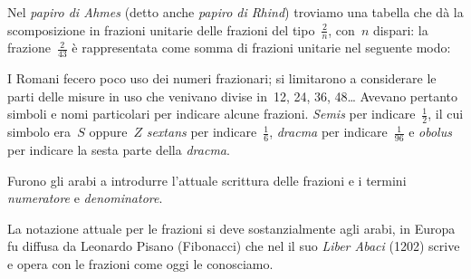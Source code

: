\vspace{-2ex}
\fi

Nel \emph{papiro di Ahmes} (detto anche \emph{papiro di Rhind}) troviamo una 
tabella che dà la scomposizione in frazioni unitarie delle frazioni del 
tipo~\(\frac{2}{n}\), con~\(n\) dispari: la frazione~\(\frac{2}{43}\)
è rappresentata come somma di frazioni unitarie nel seguente modo:


I Romani fecero poco uso dei numeri frazionari; si limitarono a considerare
le parti delle misure in uso che venivano divise in~12, 24, 36, 48\ldots 
Avevano pertanto simboli e nomi particolari per indicare alcune frazioni. 
\emph{Semis} per indicare~\(\frac{1}{2}\), il cui simbolo era~\(S\) 
oppure~\(Z\) 
\emph{sextans} per indicare~\(\frac{1}{6}\), \emph{dracma} per 
indicare~\(\frac{1}{96}\) e \emph{obolus} per indicare la sesta parte della 
\emph{dracma}.

Furono gli arabi a introdurre l'attuale scrittura delle
frazioni e i termini \emph{numeratore} e \emph{denominatore}.

La notazione attuale per le frazioni si deve sostanzialmente agli arabi, 
in Europa fu diffusa da Leonardo Pisano (Fibonacci) che nel il suo 
\emph{Liber Abaci} (1202) scrive e opera con le frazioni come oggi le 
conosciamo.

